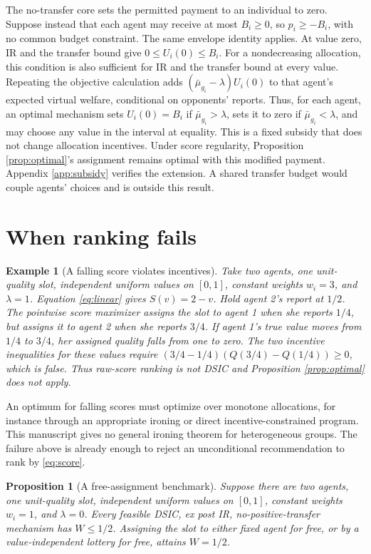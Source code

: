 \documentclass[11pt]{article}
\newtheorem{proposition}{Proposition}
\newtheorem{example}{Example}
\begin{document}
The no-transfer core sets the permitted payment to an individual to zero. Suppose instead that each agent may receive at most $B_i\ge0$, so $p_i\ge-B_i$, with no common budget constraint. The same envelope identity applies. At value zero, IR and the transfer bound give $0\le U_i(0)\le B_i$. For a nondecreasing allocation, this condition is also sufficient for IR and the transfer bound at every value. Repeating the objective calculation adds $(\bar\mu_{g_i}-\lambda)U_i(0)$ to that agent's expected virtual welfare, conditional on opponents' reports. Thus, for each agent, an optimal mechanism sets $U_i(0)=B_i$ if $\bar\mu_{g_i}>\lambda$, sets it to zero if $\bar\mu_{g_i}<\lambda$, and may choose any value in the interval at equality. This is a fixed subsidy that does not change allocation incentives. Under score regularity, Proposition \ref{prop:optimal}'s assignment remains optimal with this modified payment. Appendix \ref{app:subsidy} verifies the extension. A shared transfer budget would couple agents' choices and is outside this result.

\section{When ranking fails}\label{sec:limits}

\begin{example}[A falling score violates incentives]\label{ex:fall}
Take two agents, one unit-quality slot, independent uniform values on $[0,1]$, constant weights $w_i=3$, and $\lambda=1$. Equation \eqref{eq:linear} gives $S(v)=2-v$. Hold agent 2's report at $1/2$. The pointwise score maximizer assigns the slot to agent 1 when she reports $1/4$, but assigns it to agent 2 when she reports $3/4$. If agent 1's true value moves from $1/4$ to $3/4$, her assigned quality falls from one to zero. The two incentive inequalities for these values require $(3/4-1/4)(Q(3/4)-Q(1/4))\ge0$, which is false. Thus raw-score ranking is not DSIC and Proposition \ref{prop:optimal} does not apply.
\end{example}

An optimum for falling scores must optimize over monotone allocations, for instance through an appropriate ironing or direct incentive-constrained program. This manuscript gives no general ironing theorem for heterogeneous groups. The failure above is already enough to reject an unconditional recommendation to rank by \eqref{eq:score}.

\begin{proposition}[A free-assignment benchmark]\label{prop:free}
Suppose there are two agents, one unit-quality slot, independent uniform values on $[0,1]$, constant weights $w_i=1$, and $\lambda=0$. Every feasible DSIC, ex post IR, no-positive-transfer mechanism has $W\le1/2$. Assigning the slot to either fixed agent for free, or by a value-independent lottery for free, attains $W=1/2$.
\end{proposition}
\end{document}
